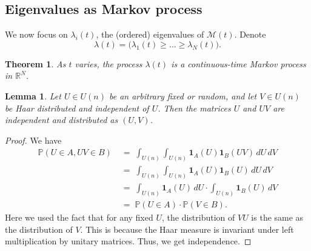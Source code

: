 \documentclass[letterpaper,11pt,oneside,reqno]{book}
\numberwithin{equation}{chapter}  %
\newtheorem{lemma}[proposition]{Lemma}
\newtheorem{theorem}[proposition]{Theorem}
\theoremstyle{definition}
\begin{document}
\subsection{Eigenvalues as Markov process}
We now focus on $\lambda_i(t)$, the (ordered) eigenvalues of $\mathcal{M}(t)$. Denote
\[
\lambda(t) = \bigl(\lambda_1(t)\ge \dots \ge \lambda_N(t)\bigr).
\]

\begin{theorem}
\label{lecture10:thm:lambda_is_markov}
As $t$ varies, the process $\lambda(t)$ is a continuous-time Markov process in $\mathbb{R}^N$.
\end{theorem}

\begin{lemma}
	\label{lecture10:lemma:U_V_Haar_indep}
	Let $U\in U(n)$ be an arbitrary fixed or random, and let $V\in U(n)$
	be Haar distributed and independent of $U$. Then the matrices $U$ and $UV$ are independent
	and distributed as $(U,V)$.
\end{lemma}
\begin{proof}
	We have
	\[
	\begin{aligned}
		\mathbb{P}(U\in A, UV\in B)
		&\;=\;
		\int_{U(n)}\int_{U(n)}\mathbf{1}_{A}(U)\mathbf{1}_{B}(UV)\,dU\,dV
		\\
		&\;=\;
		\int_{U(n)}\int_{U(n)}\mathbf{1}_{A}(U)\mathbf{1}_{B}(U)\,dU\,dV
		\\
		&\;=\;
		\int_{U(n)}\mathbf{1}_{A}(U)\,dU\cdot\int_{U(n)}\mathbf{1}_{B}(U)\,dV
		\\
		&\;=\;
		\mathbb{P}(U\in A)\cdot\mathbb{P}(V\in B).
	\end{aligned}
	\]
	Here we used the fact that for any fixed $U$, the distribution of $VU$ is the same as the distribution of $V$. This is because the Haar measure is invariant under left multiplication by unitary matrices. Thus, we get independence.
\end{proof}
\end{document}
